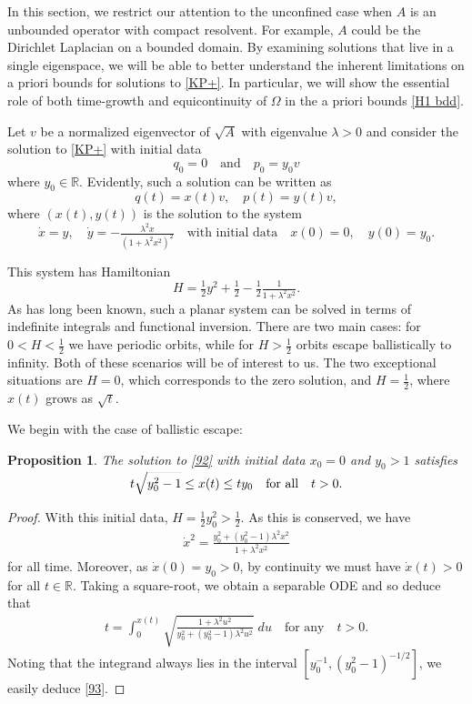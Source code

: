 \documentclass{amsart}
\newcommand{\R}{{\mathbb{R}}}
\newcommand{\qtq}[1]{\quad\text{#1}\quad}
\newtheorem{proposition}[theorem]{Proposition}
\theoremstyle{definition}
\numberwithin{equation}{section}
\begin{document}
In this section, we restrict our attention to the unconfined case when $A$ is an unbounded operator with compact resolvent.  For example, $A$ could be the Dirichlet Laplacian on a bounded domain.  By examining solutions that live in a single eigenspace, we will be able to better understand the inherent limitations on a priori bounds for solutions to \eqref{KP+}.  In particular, we will show the essential role of both time-growth and equicontinuity of $\Omega$ in the a priori bounds \eqref{H1 bdd}.

Let $v$ be a normalized eigenvector of $\sqrt{A}$ with eigenvalue $\lambda>0$ and consider the solution to \eqref{KP+} with initial data
\begin{equation}\label{91}
q_0 =0 \qtq{and} p_0 = y_0 v
\end{equation}
where $y_0\in \R$. Evidently, such a solution can be written as
$$
q(t) = x(t) v, \quad p(t)=y(t) v,
$$
where $(x(t),y(t))$ is the solution to the system
\begin{equation}\label{92}
\dot x = y, \quad \dot y = - \tfrac{\lambda^2 x}{(1+\lambda^2 x^2)^2} \qtq{with initial data} x(0)=0, \quad y(0)=y_0.
\end{equation}

This system has Hamiltonian
$$
H = \tfrac12 y^2 + \tfrac12 - \tfrac12 \tfrac{1}{1+\lambda^2x^2}.
$$
As has long been known, such a planar system can be solved in terms of indefinite integrals and functional inversion.   There are two main cases: for $0<H < \frac12$ we have periodic orbits, while for $H>\frac12$ orbits escape ballistically to infinity. Both of these scenarios will be of interest to us.  The two exceptional situations are $H=0$, which corresponds to the zero solution, and $H=\frac12$, where $x(t)$ grows as $\sqrt t$.

We begin with the case of ballistic escape:

\begin{proposition}\label{P:93}
The solution to \eqref{92} with initial data $x_0=0$ and $y_0>1$ satisfies
\begin{align}\label{93}
t \smash[t]{\sqrt{y_0^2-1}}\leq x(t) \leq t y_0 \qtq{for all} t>0 .
\end{align}
\end{proposition}

\begin{proof}
With this initial data, $H=\tfrac12 y_0^2>\frac12$.  As this is conserved, we have
\begin{align}
\dot x^2  = \frac{y_0^2+(y_0^2-1)\lambda^2x^2}{1+\lambda^2x^2} 
\end{align}
for all time. Moreover, as $\dot x(0)=y_0>0$, by continuity we must have $\dot x(t)>0$ for all $t\in \R$.  Taking a square-root, we obtain a separable ODE and so deduce that 
\begin{align*}
t = \int_0^{x(t)} \sqrt{ \tfrac{1+\lambda^2u^2}{y_0^2+(y_0^2-1)\lambda^2u^2} }\;du   \qtq{for any}  t>0 .
\end{align*}
Noting that the integrand always lies in the interval $[y_0^{-1}, (y_0^2-1)^{-1/2}]$, we easily deduce \eqref{93}.
\end{proof}
\end{document}
